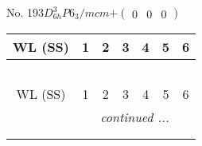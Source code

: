 \documentclass[fleqn,9pt,landscape]{jsarticle}
\begin{document}
\newpage
No. 193\quad$D_{6h}^{3}$\quad$P6_3/mcm$\quad[ hexagonal ]\quad$+\begin{pmatrix} 0 & 0 & 0 \end{pmatrix}$
\begin{center}
\renewcommand{\arraystretch}{1.2}
\begin{longtable}{ccccccc}
 \hline \hline
WL (SS) & 1 & 2 & 3 & 4 & 5 & 6 \\ \hline \endfirsthead

\multicolumn{6}{l}{\tablename\ \thetable{}} \\
 \hline \hline
WL (SS) & 1 & 2 & 3 & 4 & 5 & 6 \\ \hline \endhead

 \hline \hline
\multicolumn{6}{r}{\footnotesize\it continued ...} \\ \endfoot

 \hline \hline
\multicolumn{6}{r}{} \\ \endlastfoot


\end{longtable}
\end{center}
\end{document}
